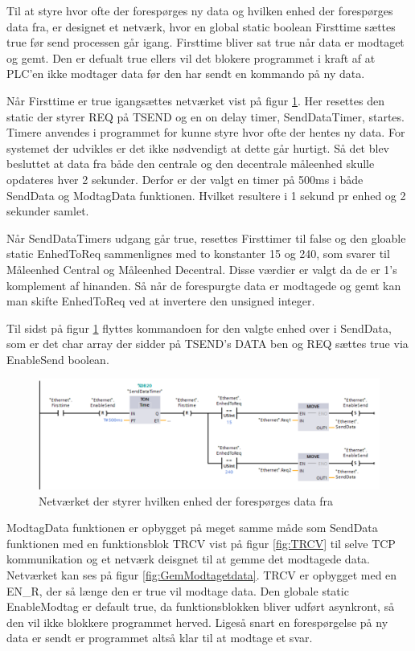 Til at styre hvor ofte der forespørges ny data og hvilken enhed der forespørges data fra, er designet et netværk, hvor en global static boolean Firsttime sættes true før send processen går igang. Firsttime bliver sat true når data er modtaget og gemt. Den er defualt true ellers vil det blokere programmet i kraft af at PLC'en ikke modtager data før den har sendt en kommando på ny data.

Når Firsttime er true igangsættes netværket vist på figur \ref{fig:ValgAfEnhedSend}. Her resettes den static der styrer REQ på TSEND og en on delay timer, SendDataTimer, startes. Timere anvendes i programmet for kunne styre hvor ofte der hentes ny data. For systemet der udvikles er det ikke nødvendigt at dette går hurtigt. Så det blev besluttet at data fra både den centrale og den decentrale måleenhed skulle opdateres hver 2 sekunder. Derfor er der valgt en timer på 500ms i både SendData og ModtagData funktionen. Hvilket resultere i 1 sekund pr enhed og 2 sekunder samlet.

Når SendDataTimers udgang går true, resettes Firsttimer til false og den gloable static EnhedToReq sammenlignes med to konstanter 15 og 240, som svarer til Måleenhed Central og Måleenhed Decentral. Disse værdier er valgt da de er 1's komplement af hinanden. Så når de forespurgte data er modtagede og gemt kan man skifte EnhedToReq ved at invertere den unsigned integer.


Til sidst på figur \ref{fig:ValgAfEnhedSend} flyttes kommandoen for den valgte enhed over i SendData, som er det char array der sidder på TSEND's DATA ben og REQ sættes true via EnableSend boolean.

\begin{figure}[H] %
	\centering
	\includegraphics[width=1\textwidth]{Figure/valgAfEnhedSend}
	\caption{Netværket der styrer hvilken enhed der forespørges data fra}
	\label{fig:ValgAfEnhedSend}
\end{figure}

ModtagData funktionen er opbygget på meget samme måde som SendData funktionen med en funktionsblok TRCV vist på figur \ref{fig:TRCV} til selve TCP kommunikation og et netværk deisgnet til at gemme det modtagede data. Netværket kan ses på figur \ref{fig:GemModtagetdata}. TRCV er opbygget med en EN\_R, der så længe den er true vil modtage data. Den globale static EnableModtag er default true, da funktionsblokken bliver udført asynkront, så den vil ikke blokkere programmet herved. Ligeså snart en forespørgelse på ny data er sendt er programmet altså klar til at modtage et svar.

